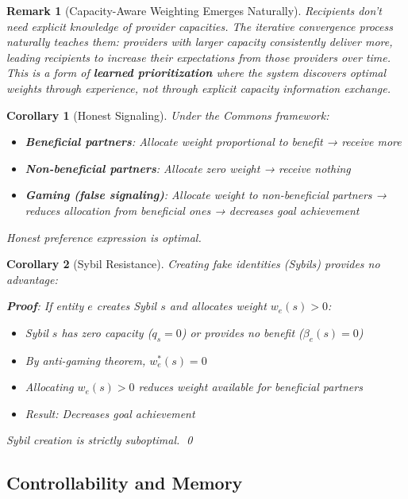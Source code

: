 \documentclass[11pt]{article}
\newtheorem{corollary}{Corollary}
\newtheorem{remark}{Remark}
\begin{document}
\begin{remark}[Capacity-Aware Weighting Emerges Naturally]
Recipients don't need explicit knowledge of provider capacities. The iterative convergence process naturally teaches them: providers with larger capacity consistently deliver more, leading recipients to increase their expectations from those providers over time. This is a form of \textbf{learned prioritization} where the system discovers optimal weights through experience, not through explicit capacity information exchange.
\end{remark}

\begin{corollary}[Honest Signaling]
Under the Commons framework:
\begin{itemize}
\item \textbf{Beneficial partners}: Allocate weight proportional to benefit → receive more
\item \textbf{Non-beneficial partners}: Allocate zero weight → receive nothing
\item \textbf{Gaming (false signaling)}: Allocate weight to non-beneficial partners → reduces allocation from beneficial ones → decreases goal achievement
\end{itemize}

Honest preference expression is optimal.
\end{corollary}

\begin{corollary}[Sybil Resistance]
Creating fake identities (Sybils) provides no advantage:

\textbf{Proof}: If entity $e$ creates Sybil $s$ and allocates weight $w_e(s) > 0$:
\begin{itemize}
\item Sybil $s$ has zero capacity ($q_s = 0$) or provides no benefit ($\beta_e(s) = 0$)
\item By anti-gaming theorem, $w_e^*(s) = 0$
\item Allocating $w_e(s) > 0$ reduces weight available for beneficial partners
\item Result: Decreases goal achievement
\end{itemize}

Sybil creation is strictly suboptimal. \qed
\end{corollary}

\subsection{Controllability and Memory}
\end{document}
